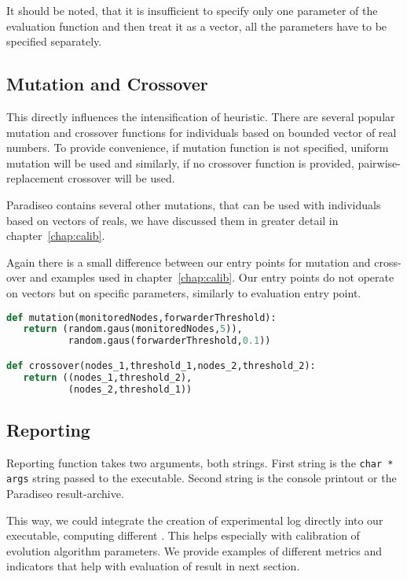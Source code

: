 \documentclass[12pt,oneside]{fithesis2}
\begin{document}
It should be noted, that it is insufficient to specify only one parameter of the evaluation function and then treat it as a vector, all the parameters have to be specified separately.

\subsection{Mutation and Crossover}
This directly influences the intensification of heuristic. There are several popular mutation and crossover functions for individuals based on bounded vector of real numbers. To provide convenience, if mutation function is not specified, uniform mutation will be used and similarly, if no crossover function is provided, pairwise-replacement crossover will be used.

Paradiseo contains several other mutations, that can be used with individuals based on vectors of reals, we have discussed them in greater detail in chapter~\ref{chap:calib}.

Again there is a small difference between our entry points for mutation and cross-over and examples used in chapter~\ref{chap:calib}. Our entry points do not operate on vectors but on specific parameters, similarly to evaluation entry point.

\begin{lstlisting}[language=Python,label=obj_example,caption=Mutation and Crossover]
def mutation(monitoredNodes,forwarderThreshold):
   return (random.gaus(monitoredNodes,5)),
           random.gaus(forwarderThreshold,0.1))

def crossover(nodes_1,threshold_1,nodes_2,threshold_2):
   return ((nodes_1,threshold_2),
           (nodes_2,threshold_1))
\end{lstlisting}

\subsection{Reporting}

Reporting function takes two arguments, both strings. First string is the \lstinline{char * args} string passed to the executable. Second string is the console printout or the Paradiseo result-archive.

This way, we could integrate the creation of experimental log directly into our executable, computing different . This helps especially with calibration of evolution algorithm parameters.
We provide examples of different metrics and indicators that help with evaluation of result in next section.
\end{document}
